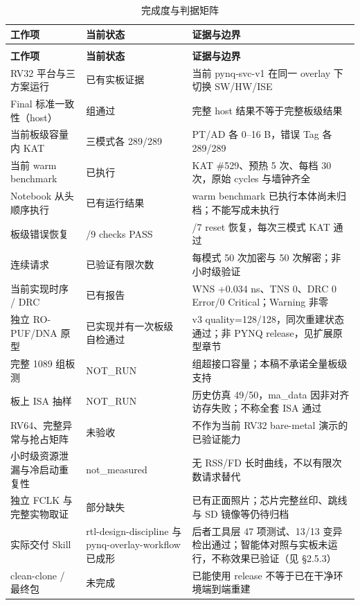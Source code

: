 {\small
\renewcommand{\thetable}{3-16}
\begin{longtable}{@{}>{\raggedright\arraybackslash}p{}>{\raggedright\arraybackslash}p{}>{\raggedright\arraybackslash}p{}@{}}
\caption{完成度与判据矩阵}\label{tab:3-16}\\
\toprule
\textbf{工作项} & \textbf{当前状态} & \textbf{证据与边界} \\
\midrule
\endfirsthead
\multicolumn{3}{@{}l}{\footnotesize 续表 3-16}\\
\toprule
\textbf{工作项} & \textbf{当前状态} & \textbf{证据与边界} \\
\midrule
\endhead
RV32 平台与三方案运行 & 已有实板证据 & 当前 pynq-svc-v1 在同一 overlay 下切换 SW/HW/ISE \\
Final 标准一致性（host） & 1089 组通过 & 完整 host 结果不等于完整板级结果 \\
当前板级容量内 KAT & 三模式各 289/289 & PT/AD 各 0--16 B，错误 Tag 各 289/289 \\
当前 warm benchmark & 已执行 & KAT \#529、预热 5 次、每档 30 次，原始 cycles 与墙钟齐全 \\
Notebook 从头顺序执行 & 已有运行结果 & warm benchmark 已执行本体尚未归档；不能写成未执行 \\
板级错误恢复 & 9/9 checks PASS & 7/7 reset 恢复，每次三模式 KAT 通过 \\
连续请求 & 已验证有限次数 & 每模式 50 次加密与 50 次解密；非小时级验证 \\
当前实现时序 / DRC & 已有报告 & WNS +0.034 ns、TNS 0、DRC 0 Error/0 Critical；Warning 非零 \\
独立 RO-PUF/DNA 原型 & 已实现并有一次板级自检通过 & v3 quality=128/128，同次重建状态通过；非 PYNQ release，见扩展原型章节 \\
完整 1089 组板测 & NOT\_\allowbreak{}RUN & 800 组超接口容量；本稿不承诺全量板级支持 \\
板上 ISA 抽样 & NOT\_\allowbreak{}RUN & 历史仿真 49/50，ma\_\allowbreak{}data 因非对齐访存失败；不称全套 ISA 通过 \\
RV64、完整异常与抢占矩阵 & 未验收 & 不作为当前 RV32 bare-metal 演示的已验证能力 \\
小时级资源泄漏与冷启动重复性 & not\_\allowbreak{}measured & 无 RSS/FD 长时曲线，不以有限次数请求替代 \\
独立 FCLK 与完整实物取证 & 部分缺失 & 已有正面照片；芯片完整丝印、跳线与 SD 镜像等仍待归档 \\
实际交付 Skill & rtl-\allowbreak{}design-\allowbreak{}discipline 与 pynq-\allowbreak{}overlay-\allowbreak{}workflow 已成形 & 后者工具层 47 项测试、13/13 变异检出通过；智能体对照与实板未运行，不称效果已验证（见 §2.5.3） \\
clean-clone / 最终包 & 未完成 & 已能使用 release 不等于已在干净环境端到端重建 \\
\bottomrule
\end{longtable}
}

